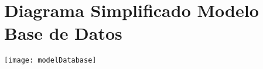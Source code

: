 \chapter{Diagrama Simplificado Modelo Base de Datos}

\begin{minipage}{1.0\textwidth}
	\centering
	\texttt{[image: modelDatabase]}
\end{minipage}

